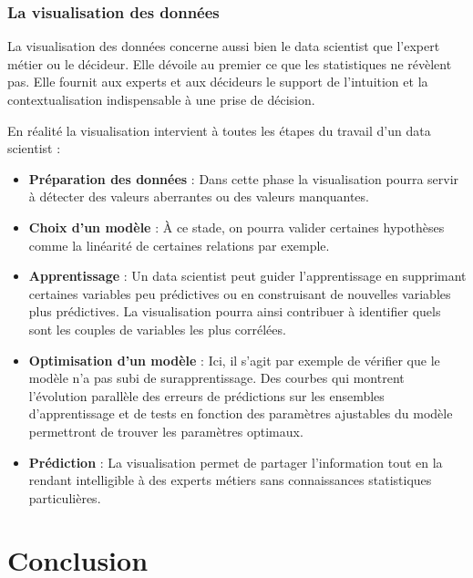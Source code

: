 \documentclass[12pt]{article}
\begin{document}
\subsubsection{La visualisation des données}
La visualisation des données concerne aussi bien le data scientist que l’expert métier ou le décideur. Elle dévoile au premier ce que les statistiques ne révèlent pas. Elle fournit aux experts et aux décideurs le support de l’intuition et la contextualisation indispensable à une prise de décision.\par
En réalité la visualisation intervient à toutes les étapes du travail d’un data scientist :
\begin{itemize}
\item \textbf{Préparation des données} : Dans cette phase la visualisation pourra servir à détecter des valeurs aberrantes ou des valeurs manquantes.
\item  \textbf{Choix d'un modèle} : À ce stade, on pourra valider certaines hypothèses comme la linéarité de certaines relations par exemple.
\item \textbf{Apprentissage} : Un data scientist peut guider l'apprentissage en supprimant certaines variables peu prédictives ou en construisant de nouvelles variables plus prédictives. La visualisation pourra ainsi contribuer à identifier quels sont les couples de variables les plus corrélées.
\item  \textbf{Optimisation d'un modèle} : Ici, il s'agit par exemple de vérifier que le modèle n'a pas subi de surapprentissage. Des courbes qui montrent l'évolution parallèle des erreurs de prédictions sur les ensembles d'apprentissage et de tests en fonction des paramètres ajustables du modèle permettront de trouver les paramètres optimaux.
\item \textbf{Prédiction} : La visualisation permet de partager l'information tout en la rendant intelligible à des experts métiers sans connaissances statistiques particulières.

\end{itemize}
\section{Conclusion}

\newpage
\end{document}
